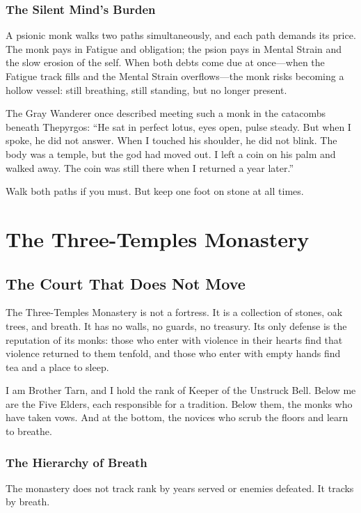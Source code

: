 \documentclass[11pt]{book}
\begin{document}
\section{The Silent Mind's Burden}

A psionic monk walks two paths simultaneously, and each path demands its price. The monk pays in Fatigue and obligation; the psion pays in Mental Strain and the slow erosion of the self. When both debts come due at once---when the Fatigue track fills and the Mental Strain overflows---the monk risks becoming a hollow vessel: still breathing, still standing, but no longer present.

The Gray Wanderer once described meeting such a monk in the catacombs beneath Thepyrgos: ``He sat in perfect lotus, eyes open, pulse steady. But when I spoke, he did not answer. When I touched his shoulder, he did not blink. The body was a temple, but the god had moved out. I left a coin on his palm and walked away. The coin was still there when I returned a year later.''

Walk both paths if you must. But keep one foot on stone at all times.

\part{The Three-Temples Monastery}

\chapter{The Court That Does Not Move}

The Three-Temples Monastery is not a fortress. It is a collection of stones, oak trees, and breath. It has no walls, no guards, no treasury. Its only defense is the reputation of its monks: those who enter with violence in their hearts find that violence returned to them tenfold, and those who enter with empty hands find tea and a place to sleep.

I am Brother Tarn, and I hold the rank of Keeper of the Unstruck Bell. Below me are the Five Elders, each responsible for a tradition. Below them, the monks who have taken vows. And at the bottom, the novices who scrub the floors and learn to breathe.

\section{The Hierarchy of Breath}

The monastery does not track rank by years served or enemies defeated. It tracks by breath.
\end{document}
